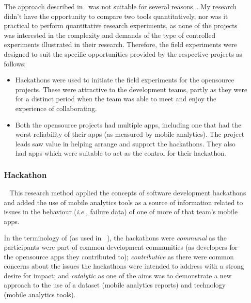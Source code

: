 The approach described in~ was not suitable for several reasons~. 
%
My research didn't have the opportunity to compare two tools quantitatively, nor was it practical to perform quantitative research experiments, as none of the projects was interested in the complexity and demands of the type of controlled experiments illustrated in their research. Therefore, the field experiments were designed to suit the specific opportunities provided by the respective projects as follows:
\begin{itemize}
    \item Hackathons were used to initiate the field experiments for the opensource projects. These were attractive to the development teams, partly as they were for a distinct period when the team was able to meet and enjoy the experience of collaborating.
    \item Both the opensource projects had multiple apps, including one that had the worst reliability of their apps (as measured by mobile analytics). The project leads saw value in helping arrange and support the hackathons. They also had apps which were suitable to act as the control for their hackathon. 
\end{itemize}

\subsubsection{Hackathon}~\label{section-hackathon-research-method}
This research method applied the concepts of software development hackathons and added the use of mobile analytics tools as a source of information related to issues in the behaviour (\emph{i.e.}, failure data) of one of more of that team's mobile apps.

In the terminology of  (as used in ~), the hackathons were 
\emph{communal} as the participants were part of common development communities (as developers for the opensource apps they contributed to); \emph{contributive} as there were common concerns about the issues the hackathons were intended to address with a strong desire for impact; and \emph{catalytic} as one of the aims was to demonstrate a new approach to the use of a dataset (mobile analytics reports) and technology (mobile analytics tools).  

